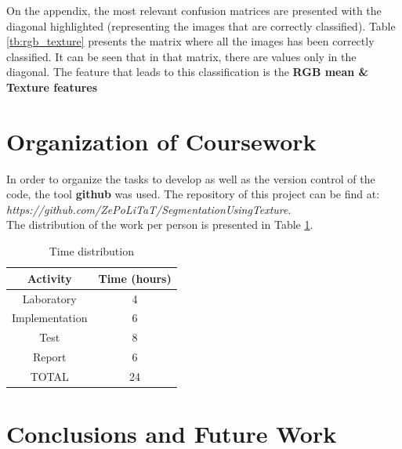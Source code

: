 \documentclass{IEEEtran}
\begin{document}
On the appendix, the most relevant confusion matrices are presented with the diagonal highlighted (representing the images that are correctly classified). Table \ref{tb:rgb_texture} presents the matrix where all the images has been correctly classified. It can be seen that in that matrix, there are values only in the diagonal. The feature that leads to this classification is the \textbf{RGB mean \& Texture features}

\section{Organization of Coursework}

In order to organize the tasks to develop as well as the version control of the code,
the tool {\bf github} was used. The repository of this project can be find at:
\textit{https://github.com/ZePoLiTaT/SegmentationUsingTexture}.\\

The distribution of the work per person is presented in Table \ref{table:time}.

\begin{table}[h!]
\centering
  \begin{tabular}{ | c | c | }
    \hline
    Activity & Time (hours)  \\ \hline
    Laboratory & 4\\ \hline
    Implementation & 6 \\ \hline
    Test & 8 \\ \hline
    Report & 6 \\ \hline
    TOTAL & 24 \\ \hline
  \end{tabular}
  \caption{Time distribution}
  \label{table:time}
\end{table}

\section{Conclusions and Future Work}
\end{document}
